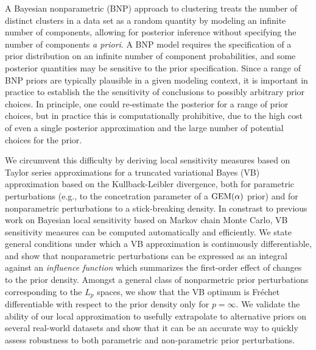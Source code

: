 A Bayesian nonparametric (BNP) approach to clustering treats the number of
distinct clusters in a data set as a random quantity by modeling an infinite
number of components, allowing for posterior inference without specifying the
number of components {\em a priori}.  A BNP model requires the specification of
a prior distribution on an infinite number of component probabilities, and some
posterior quantities may be sensitive to the prior specification. Since a range
of BNP priors are typically plausible in a given modeling context, it is
important in practice to establish the the sensitivity of conclusions to
possibly arbitrary prior choices.  In principle, one could re-estimate the
posterior for a range of prior choices, but in practice this is computationally
prohibitive, due to the high cost of even a single posterior approximation and
the large number of potential choices for the prior.

We circumvent this difficulty by deriving local sensitivity measures based on
Taylor series approximations for a truncated variational Bayes (VB)
approximation based on the Kullback-Leibler divergence, both for parametric
perturbations (e.g., to the concetration parameter of a $\mathrm{GEM}(\alpha)$ prior) and for
nonparametric perturbations to a stick-breaking density.  In constrast to
previous work on Bayesian local sensitivity based on Markov chain Monte Carlo,
VB sensitivity measures can be computed automatically and efficiently.  We state
general conditions under which a VB approximation is continuously
differentiable, and show that nonparametric perturbations can be expressed as an
integral against an \textit{influence function} which summarizes the first-order
effect of changes to the prior density.   Amongst a general class of
nonparmetric prior perturbations corresponding to the $L_p$ spaces, we show that
the VB optimum is Fr{\'e}chet differentiable with respect to the prior density
only for $p=\infty$.  We validate the ability of our local approximation to
usefully extrapolate to alternative priors on several real-world datasets and
show that it can be an accurate way to quickly assess robustness to both
parametric and non-parametric prior perturbations.

